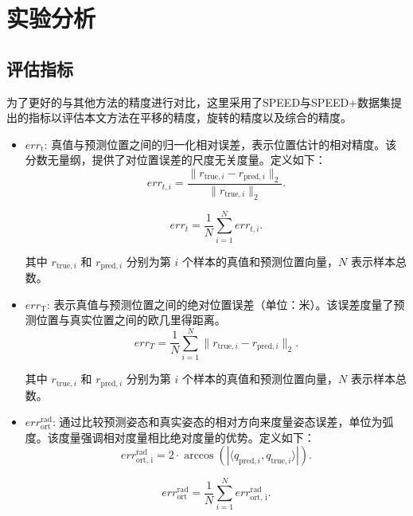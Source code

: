 \section{实验分析}
\subsection{评估指标}
为了更好的与其他方法的精度进行对比，这里采用了SPEED与SPEED+数据集提出的指标以评估本文方法在平移的精度，旋转的精度以及综合的精度。

\begin{itemize}
	\item $err_{\text{t}}$: 真值与预测位置之间的归一化相对误差，表示位置估计的相对精度。该分数无量纲，提供了对位置误差的尺度无关度量。定义如下：
	\begin{equation}
		err_{t,i} = \frac{\| r_{\text{true},i} - r_{\text{pred},i} \|_2}{\| r_{\text{true},i} \|_2}.
	\end{equation}
	
	\begin{equation}
		err_t = \frac{1}{N} \sum\limits_{i=1}^{N} err_{t,i}.
	\end{equation}
	
	其中 $r_{\text{true},i}$ 和 $r_{\text{pred},i}$ 分别为第 $i$ 个样本的真值和预测位置向量，$N$ 表示样本总数。
	
	\item $err_{\text{T}}$: 表示真值与预测位置之间的绝对位置误差（单位：米）。该误差度量了预测位置与真实位置之间的欧几里得距离。
	\begin{equation}
		err_T = \frac{1}{N}\sum\limits_{i=1}^{N} \| r_{\text{true},i} - r_{\text{pred},i} \|_2.
	\end{equation}
	
	其中 $r_{\text{true},i}$ 和 $r_{\text{pred},i}$ 分别为第 $i$ 个样本的真值和预测位置向量，$N$ 表示样本总数。
	
	\item $err_{\text{ort}}^{\text{rad}}$: 通过比较预测姿态和真实姿态的相对方向来度量姿态误差，单位为弧度。该度量强调相对度量相比绝对度量的优势。定义如下：
	\begin{equation}
		err_{\text{ort, i}}^{\text{rad}} =  2 \cdot \arccos \left( \left| \langle q_{\text{pred},i}, q_{\text{true},i} \rangle \right| \right).
	\end{equation}
	
	\begin{equation}
		err_{\text{ort}}^{\text{rad}} = \frac{1}{N}\sum\limits_{i=1}^N err_{\text{ort, i}}^{\text{rad}}.
	\end{equation}
	

\end{itemize}
